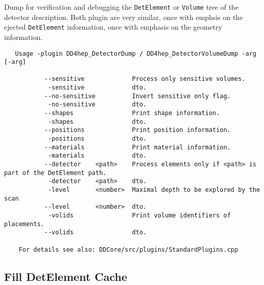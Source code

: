 Dump for verification and debugging the \texttt{DetElement} or \texttt{Volume} tree
of the detector description. Both plugin are very similar, once with emphsis on the
ejected \texttt{DetElement} information, once with emphasis on the geometry information.
\begin{verbatim}
   Usage -plugin DD4hep_DetectorDump / DD4hep_DetectorVolumeDump -arg [-arg]

	       --sensitive             Process only sensitive volumes.                                
	        -sensitive             dto.                                                           
	       --no-sensitive          Invert sensitive only flag.                                    
	        -no-sensitive          dto.                                                           
	       --shapes                Print shape information.                                       
	        -shapes                dto.                                                           
	       --positions             Print position information.                                    
	        -positions             dto.                                                           
	       --materials             Print material information.                                    
	        -materials             dto.                                                           
	       --detector    <path>    Process elements only if <path> is part of the DetElement path.
	        -detector    <path>    dto.                                                           
	        -level       <number>  Maximal depth to be explored by the scan                       
	       --level       <number>  dto.                                                           
	        -volids                Print volume identifiers of placements.                        
	       --volids                dto.                                                           

    For details see also: DDCore/src/plugins/StandardPlugins.cpp
\end{verbatim}

\subsection{Fill DetElement Cache}
\label{sec:dd4hep-manual-plugin-chache-detelement-info}

